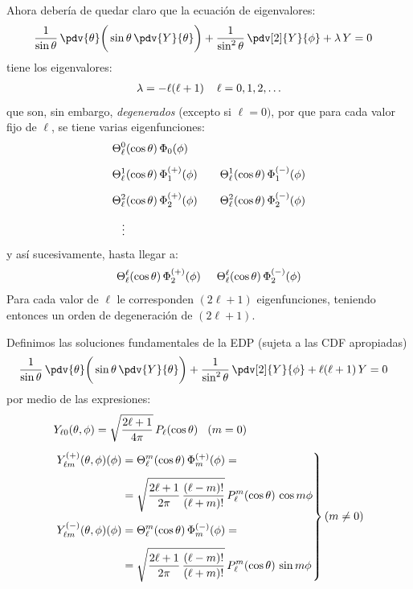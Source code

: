 Ahora debería de quedar claro que la ecuación de eigenvalores:
\begin{align*}
\dfrac{1}{\sin \theta} \, \pdv{\theta} \bigg( \sin \theta \, \pdv{Y}{\theta} \bigg) &+ \dfrac{1}{\sin^{2} \theta} \, \pdv[2]{Y}{\phi} + \lambda \, Y = 0
\end{align*}
tiene los eigenvalores:
\begin{align*}
\lambda = - \ell (\ell + 1) \hspace{0.4cm} \ell = 0, 1, 2, \ldots
\end{align*}
que son, sin embargo, \emph{degenerados} (excepto si $\ell = 0)$, por que para cada valor fijo de $\ell$, se tiene varias eigenfunciones:
\begin{align*}
&\Theta_{\ell}^{0} (\cos \theta) \, \Phi_{0} (\phi) \\[0.5em]
&\Theta_{\ell}^{1} (\cos \theta) \, \Phi_{1}^{(+)} (\phi) \hspace{0.7cm} \Theta_{\ell}^{1} (\cos \theta) \, \Phi_{1}^{(-)} (\phi) \\[0.5em]
&\Theta_{\ell}^{2} (\cos \theta) \, \Phi_{2}^{(+)} (\phi) \hspace{0.7cm} \Theta_{\ell}^{2} (\cos \theta) \, \Phi_{2}^{(-)} (\phi) \\[0.5em]
&{} \hspace{0.3cm} \vdots
\end{align*}
y así sucesivamente, hasta llegar a:
\begin{align*}
\Theta_{\ell}^{\ell} (\cos \theta) \, \Phi_{2}^{(+)} (\phi) \hspace{0.5cm} \Theta_{\ell}^{\ell} (\cos \theta) \, \Phi_{2}^{(-)} (\phi)
\end{align*}
Para cada valor de $\ell$ le corresponden $(2 \ell + 1)$ eigenfunciones, teniendo entonces un orden de degeneración de $(2 \ell + 1)$.
\par
Definimos las soluciones fundamentales de la EDP (sujeta a las CDF apropiadas)
\begin{align*}
\dfrac{1}{\sin \theta} \, \pdv{\theta} \bigg( \sin \theta \, \pdv{Y}{\theta} \bigg) &+ \dfrac{1}{\sin^{2} \theta} \, \pdv[2]{Y}{\phi} + \ell (\ell + 1) \, Y = 0
\end{align*}
por medio de las expresiones:
\begin{align*}
&Y_{\ell 0} (\theta, \phi) = \sqrt{\dfrac{2 \ell + 1}{4 \pi}} \, P_{\ell} (\cos \theta) \hspace{0.3cm} (m = 0) \\[0.5em]
&\left. \begin{aligned}
Y_{\ell m}^{(+)} (\theta, \phi)  (\phi) &= \Theta_{\ell}^{m} (\cos \theta) \, \Phi_{m}^{(+)} (\phi) = \\[0.5em]
&= \sqrt{\dfrac{2 \ell + 1}{2 \pi} \, \dfrac{(\ell - m)!}{(\ell + m)!}} \, P_{\ell}^{m} (\cos \theta) \, \cos m \phi \\[0.5em]
Y_{\ell m}^{(-)} (\theta, \phi)  (\phi) &= \Theta_{\ell}^{m} (\cos \theta) \, \Phi_{m}^{(-)} (\phi) = \\[0.5em]
&= \sqrt{\dfrac{2 \ell + 1}{2 \pi} \, \dfrac{(\ell - m)!}{(\ell + m)!}} \, P_{\ell}^{m} (\cos \theta) \, \sin m \phi
\end{aligned} \right\}
(m \neq 0)
\end{align*}
